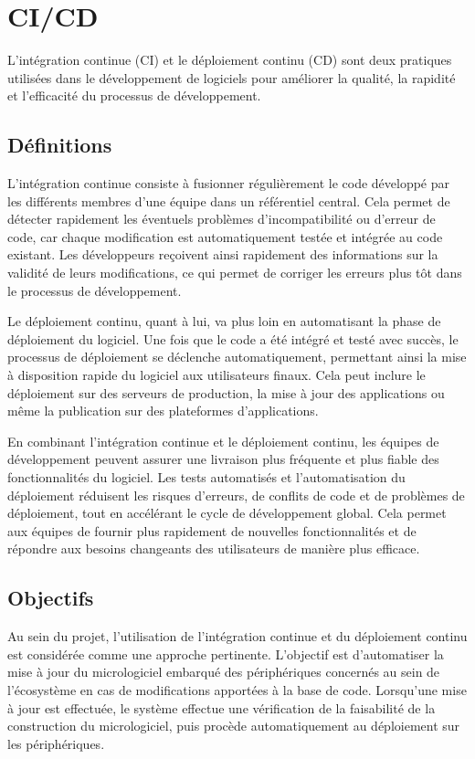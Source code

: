 \section{CI/CD}

L'intégration continue (CI) et le déploiement continu (CD) sont deux pratiques utilisées dans le développement de logiciels pour améliorer la qualité, la rapidité et l'efficacité du processus de développement.

\subsection{Définitions}

L'intégration continue consiste à fusionner régulièrement le code développé par les différents membres d'une équipe dans un référentiel central.
Cela permet de détecter rapidement les éventuels problèmes d'incompatibilité ou d'erreur de code, car chaque modification est automatiquement testée et intégrée au code existant.
Les développeurs reçoivent ainsi rapidement des informations sur la validité de leurs modifications, ce qui permet de corriger les erreurs plus tôt dans le processus de développement.

Le déploiement continu, quant à lui, va plus loin en automatisant la phase de déploiement du logiciel.
Une fois que le code a été intégré et testé avec succès, le processus de déploiement se déclenche automatiquement, permettant ainsi la mise à disposition rapide du logiciel aux utilisateurs finaux.
Cela peut inclure le déploiement sur des serveurs de production, la mise à jour des applications ou même la publication sur des plateformes d'applications.

En combinant l'intégration continue et le déploiement continu, les équipes de développement peuvent assurer une livraison plus fréquente et plus fiable des fonctionnalités du logiciel.
Les tests automatisés et l'automatisation du déploiement réduisent les risques d'erreurs, de conflits de code et de problèmes de déploiement, tout en accélérant le cycle de développement global.
Cela permet aux équipes de fournir plus rapidement de nouvelles fonctionnalités et de répondre aux besoins changeants des utilisateurs de manière plus efficace.

\subsection{Objectifs}

Au sein du projet, l'utilisation de l'intégration continue et du déploiement continu est considérée comme une approche pertinente.
L'objectif est d'automatiser la mise à jour du micrologiciel embarqué des périphériques concernés au sein de l'écosystème en cas de modifications apportées à la base de code.
Lorsqu'une mise à jour est effectuée, le système effectue une vérification de la faisabilité de la construction du micrologiciel, puis procède automatiquement au déploiement sur les périphériques.

